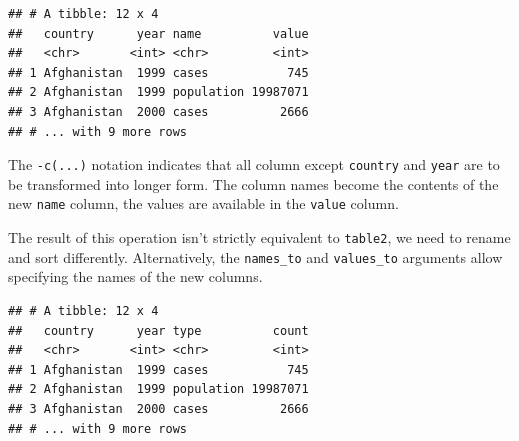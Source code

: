 \documentclass[]{book}
\newenvironment{Shaded}{}{}
\newcommand{\DataTypeTok}[1]{#1}
\newcommand{\KeywordTok}[1]{\textcolor[rgb]{0.00,0.00,1.00}{#1}}
\newcommand{\NormalTok}[1]{#1}
\newcommand{\OperatorTok}[1]{#1}
\newcommand{\StringTok}[1]{\textcolor[rgb]{0.00,0.50,0.50}{#1}}
\begin{document}
\begin{Shaded}
\end{Shaded}

\begin{verbatim}
## # A tibble: 12 x 4
##   country      year name          value
##   <chr>       <int> <chr>         <int>
## 1 Afghanistan  1999 cases           745
## 2 Afghanistan  1999 population 19987071
## 3 Afghanistan  2000 cases          2666
## # ... with 9 more rows
\end{verbatim}

The \texttt{-c(...)} notation indicates that all column except \texttt{country} and \texttt{year} are to be transformed into longer form.
The column names become the contents of the new \texttt{name} column, the values are available in the \texttt{value} column.

The result of this operation isn't strictly equivalent to \texttt{table2}, we need to rename and sort differently.
Alternatively, the \texttt{names\_to} and \texttt{values\_to} arguments allow specifying the names of the new columns.

\begin{Shaded}
\end{Shaded}

\begin{verbatim}
## # A tibble: 12 x 4
##   country      year type          count
##   <chr>       <int> <chr>         <int>
## 1 Afghanistan  1999 cases           745
## 2 Afghanistan  1999 population 19987071
## 3 Afghanistan  2000 cases          2666
## # ... with 9 more rows
\end{verbatim}

\begin{Shaded}
\end{Shaded}
\end{document}

